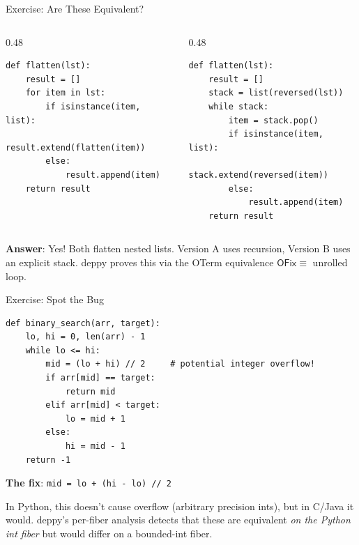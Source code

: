 \documentclass[aspectratio=169,11pt]{beamer}
\begin{document}

\begin{frame}[fragile]{Exercise: Are These Equivalent?}
\begin{columns}
\begin{column}{0.48\textwidth}
\begin{lstlisting}[language=deppy,title={\textbf{Version A}}]
def flatten(lst):
    result = []
    for item in lst:
        if isinstance(item, list):
            result.extend(flatten(item))
        else:
            result.append(item)
    return result
\end{lstlisting}
\end{column}
\begin{column}{0.48\textwidth}
\begin{lstlisting}[language=deppy,title={\textbf{Version B}}]
def flatten(lst):
    result = []
    stack = list(reversed(lst))
    while stack:
        item = stack.pop()
        if isinstance(item, list):
            stack.extend(reversed(item))
        else:
            result.append(item)
    return result
\end{lstlisting}
\end{column}
\end{columns}

\vspace{0.5em}
\textbf{Answer}: Yes! Both flatten nested lists. Version A uses
recursion, Version B uses an explicit stack. deppy proves this via
the OTerm equivalence $\mathsf{OFix} \equiv$ unrolled loop.
\end{frame}

\begin{frame}[fragile]{Exercise: Spot the Bug}
\begin{lstlisting}[language=deppy]
def binary_search(arr, target):
    lo, hi = 0, len(arr) - 1
    while lo <= hi:
        mid = (lo + hi) // 2     # potential integer overflow!
        if arr[mid] == target:
            return mid
        elif arr[mid] < target:
            lo = mid + 1
        else:
            hi = mid - 1
    return -1
\end{lstlisting}

\textbf{The fix}: \texttt{mid = lo + (hi - lo) // 2}

In Python, this doesn't cause overflow (arbitrary precision ints),
but in C/Java it would. deppy's per-fiber analysis detects that
these are equivalent \emph{on the Python int fiber} but would differ
on a bounded-int fiber.
\end{frame}
\end{document}
